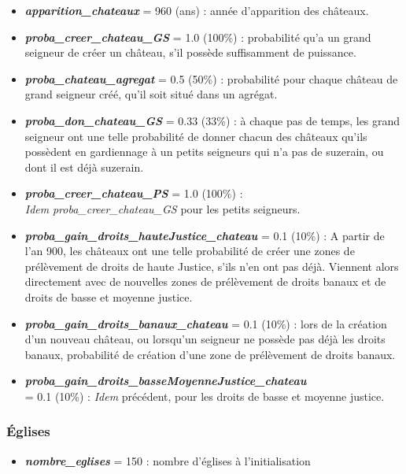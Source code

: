 \documentclass[a4paper,11pt]{article}
\begin{document}
{\begin{itemize}
		\item \textbf{\textit{apparition\_chateaux}} = 960 (ans) : année d'apparition des châteaux.
		
	\item \textbf{\textit{proba\_creer\_chateau\_GS}} = 1.0 (100\%) : probabilité qu'a un grand seigneur de créer un château, s'il possède suffisamment de puissance.
	
	\item \textbf{\textit{proba\_chateau\_agregat}} = 0.5 (50\%) : probabilité pour chaque château de grand seigneur créé, qu'il soit situé dans un agrégat.
	
	\item \textbf{\textit{proba\_don\_chateau\_GS}} = 0.33 (33\%) : à chaque pas de temps, les grand seigneur ont une telle probabilité de donner chacun des châteaux qu'ils possèdent en gardiennage à un petits seigneurs qui n'a pas de suzerain, ou dont il est déjà suzerain.
	
	\item \textbf{\textit{proba\_creer\_chateau\_PS}} = 1.0 (100\%) :\\
	\textit{Idem} \textit{proba\_creer\_chateau\_GS} pour les petits seigneurs.
	
	\item \textbf{\textit{proba\_gain\_droits\_hauteJustice\_chateau}} = 0.1 (10\%) : 
	A partir de l'an 900, les châteaux ont une telle probabilité de créer une zones de prélèvement de droits de haute Justice, s'ils n'en ont pas déjà. Viennent alors directement avec de nouvelles zones de prélèvement de droits banaux et de droits de basse et moyenne justice.
	
	\item \textbf{\textit{proba\_gain\_droits\_banaux\_chateau}} = 0.1 (10\%) : lors de la création d'un nouveau château, ou lorsqu'un seigneur ne possède pas déjà les droits banaux, probabilité de création d'une zone de prélèvement de droits banaux.
	
	\item \textbf{\textit{proba\_gain\_droits\_basseMoyenneJustice\_chateau}}\\= 0.1 (10\%) : \textit{Idem} précédent, pour les droits de basse et moyenne justice.
	
\end{itemize}

\subsubsection{Églises}
\begin{itemize}
	\item \textbf{\textit{nombre\_eglises}} = 150 : nombre d'églises à l'initialisation
	

\end{itemize}}
\end{document}
